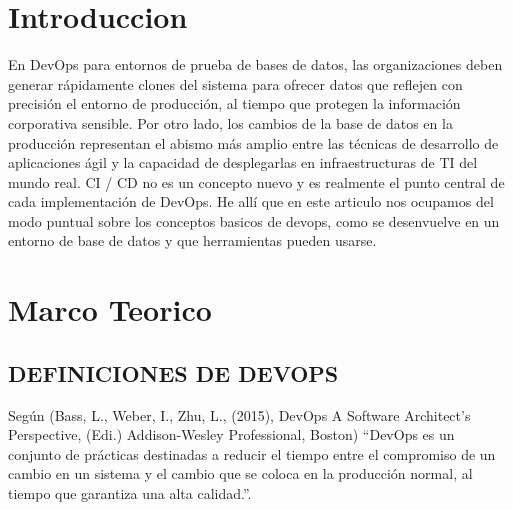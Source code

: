 \documentclass[preprint,12pt]{elsarticle}
\begin{document}
\section{Introduccion}
En DevOps para entornos de prueba de bases de datos, las organizaciones deben generar rápidamente clones del sistema para ofrecer datos que reflejen con precisión el entorno de producción, al tiempo que protegen la información corporativa sensible. Por otro lado, los cambios de la base de datos en la producción representan el abismo más amplio entre las técnicas de desarrollo de aplicaciones ágil y la capacidad de desplegarlas en infraestructuras de TI del mundo real.
CI / CD no es un concepto nuevo y es realmente el punto central de cada implementación de DevOps. He allí que en este articulo nos ocupamos del modo puntual sobre los conceptos basicos de devops, como se desenvuelve en un entorno de base de datos y que herramientas pueden usarse.
	
	
\section{Marco Teorico}
	
\subsection{DEFINICIONES DE DEVOPS}	

Según (Bass, L., Weber, I., Zhu, L., (2015), DevOps A Software Architect’s Perspective, (Edi.) Addison-Wesley Professional, Boston) “DevOps es un conjunto de prácticas destinadas a reducir el tiempo entre el compromiso de un cambio en un sistema y el cambio que se coloca en la producción normal, al tiempo que garantiza una alta calidad.”.
\end{document}
